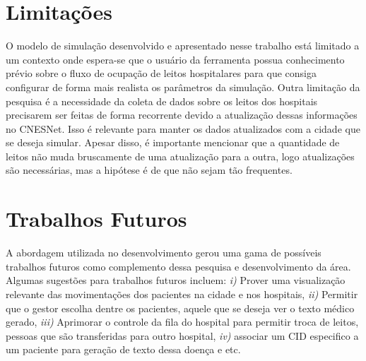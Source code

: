 \section{Limitações}
O modelo de simulação desenvolvido e apresentado nesse trabalho está limitado a um contexto onde espera-se que o usuário da ferramenta possua conhecimento prévio sobre o fluxo de ocupação de leitos hospitalares para que consiga configurar de forma mais realista os parâmetros da simulação. %
Outra limitação da pesquisa é a necessidade da coleta de dados sobre os leitos dos hospitais precisarem ser feitas de forma recorrente devido a atualização dessas informações no CNESNet. Isso é relevante para manter os dados atualizados com a cidade que se deseja simular. Apesar disso, é importante mencionar que a quantidade de leitos não muda bruscamente de uma atualização para a outra, logo atualizações são necessárias, mas a hipótese é de que não sejam tão frequentes. %

\section{Trabalhos Futuros}
A abordagem utilizada no desenvolvimento gerou uma gama de possíveis trabalhos futuros como complemento dessa pesquisa e desenvolvimento da área. Algumas sugestões para trabalhos futuros incluem: \textit{i)} Prover uma visualização relevante das movimentações dos pacientes na cidade e nos hospitais, \textit{ii)} Permitir que o gestor escolha dentre os pacientes, aquele que se deseja ver o texto médico gerado,  \textit{iii)} Aprimorar o controle da fila do hospital para permitir troca de leitos, pessoas que são transferidas para outro hospital, \textit{iv)} associar um CID especifico a um paciente para geração de texto dessa doença e etc.






